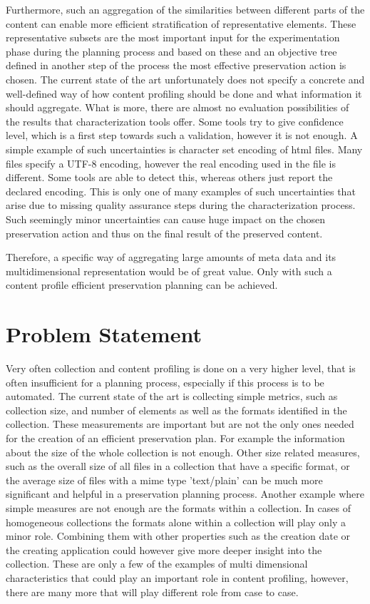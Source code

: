 Furthermore, such an aggregation of the similarities between different parts of the content can enable more efficient stratification of representative elements. These representative subsets 
are the most important input for the experimentation phase during the planning process and based on these and an objective tree defined in another step of the process the most effective preservation action is chosen.
The current state of the art unfortunately does not specify a concrete and well-defined way of how content profiling should be done and what information it should aggregate. What is more, there are almost no evaluation possibilities of the results that characterization tools offer. Some tools try to give confidence level, which is a first step towards such a validation, however it is not enough. A simple example of such uncertainties is character set encoding of html files. Many files specify a UTF-8 encoding, however the real encoding used in the file is different. Some tools are able to detect this, whereas others just report the declared encoding. This is only one of many examples of such uncertainties that arise due to missing quality assurance steps during the characterization process. Such seemingly minor uncertainties can cause huge impact on the chosen preservation action and thus on the final result of the preserved content.

Therefore, a specific way of aggregating large amounts of meta data and its multidimensional representation would be of great value. Only with such a content profile efficient preservation planning can be achieved.

\section{Problem Statement}
Very often collection and content profiling is done on a very higher level, that
is often insufficient for a planning process, especially if this process is to be automated.
The current state of the art is collecting simple metrics, such as collection size, and number of elements as well as the formats identified in the collection. These measurements are important but are not the only ones needed for the creation of an efficient preservation plan.
For example the information about the size of the whole collection is not enough. Other size related measures, such as the overall size of all files in a collection that have a specific format, or the average size of files with a mime type 'text/plain' can be much more significant and helpful in a preservation planning process. Another example where simple measures are not enough are the formats within a collection. In cases of homogeneous collections the formats alone within a collection will play only a minor role. Combining them with other properties such as the creation date or the creating application could however give more deeper insight into the collection.
These are only a few of the examples of multi dimensional characteristics that could play an important role in content profiling, however, there are many more that will play different role from case to case.

